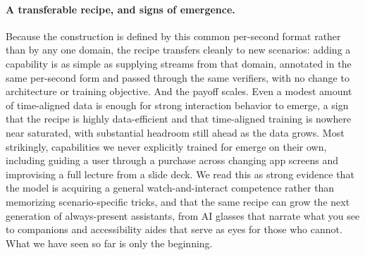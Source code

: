 \paragraph{\textbf{A transferable recipe, and signs of emergence.}}
Because the construction is defined by this common per-second format rather than by any one domain, the recipe transfers cleanly to new scenarios: adding a capability is as simple as supplying streams from that domain, annotated in the same per-second form and passed through the same verifiers, with no change to architecture or training objective. And the payoff scales. Even a modest amount of time-aligned data is enough for strong interaction behavior to emerge, a sign that the recipe is highly data-efficient and that time-aligned training is nowhere near saturated, with substantial headroom still ahead as the data grows. Most strikingly, capabilities we never explicitly trained for emerge on their own, including guiding a user through a purchase across changing app screens and improvising a full lecture from a slide deck. We read this as strong evidence that the model is acquiring a general watch-and-interact competence rather than memorizing scenario-specific tricks, and that the same recipe can grow the next generation of always-present assistants, from AI glasses that narrate what you see to companions and accessibility aides that serve as eyes for those who cannot. What we have seen so far is only the beginning. 






